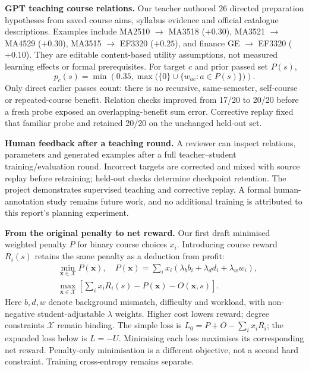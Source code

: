 \documentclass{article}
\begin{document}
\textbf{GPT teaching course relations.} Our teacher authored 26 directed preparation hypotheses from saved course aims, syllabus evidence and official catalogue descriptions. Examples include MA2510 $\rightarrow$ MA3518 ($+0.30$), MA3521 $\rightarrow$ MA4529 ($+0.30$), MA3515 $\rightarrow$ EF3320 ($+0.25$), and finance GE $\rightarrow$ EF3320 ($+0.10$). They are editable content-based utility assumptions, not measured learning effects or formal prerequisites. For target $c$ and prior passed set $P(s)$,
\begin{equation}
p_c(s)=\min\!\left(0.35,\max\bigl(\{0\}\cup\{w_{ac}:a\in P(s)\}\bigr)\right).
\end{equation}
Only direct earlier passes count: there is no recursive, same-semester, self-course or repeated-course benefit. Relation checks improved from 17/20 to 20/20 before a fresh probe exposed an overlapping-benefit sum error. Corrective replay fixed that familiar probe and retained 20/20 on the unchanged held-out set.

\textbf{Human feedback after a teaching round.} A reviewer can inspect relations, parameters and generated examples after a full teacher--student training/evaluation round. Incorrect targets are corrected and mixed with source replay before retraining; held-out checks determine checkpoint retention. The project demonstrates supervised teaching and corrective replay. A formal human-annotation study remains future work, and no additional training is attributed to this report's planning experiment.

\textbf{From the original penalty to net reward.} Our first draft minimised weighted penalty $P$ for binary course choices $x_i$. Introducing course reward $R_i(s)$ retains the same penalty as a deduction from profit:
\begin{align}
&\min_{\mathbf x\in\mathcal X}P(\mathbf x),\quad P(\mathbf x)=\sum_i x_i(\lambda_b b_i+\lambda_d d_i+\lambda_w w_i),\label{eq:originalpenalty}\\
&\max_{\mathbf x\in\mathcal X}\left[\sum_i x_iR_i(s)-P(\mathbf x)-O(\mathbf x,s)\right].\label{eq:rewardconversion}
\end{align}
Here $b,d,w$ denote background mismatch, difficulty and workload, with non-negative student-adjustable $\lambda$ weights. Higher cost lowers reward; degree constraints $\mathcal X$ remain binding. The simple loss is $L_0=P+O-\sum_i x_iR_i$; the expanded loss below is $L=-U$. Minimising each loss maximises its corresponding net reward. Penalty-only minimisation is a different objective, not a second hard constraint. Training cross-entropy remains separate.
\end{document}

